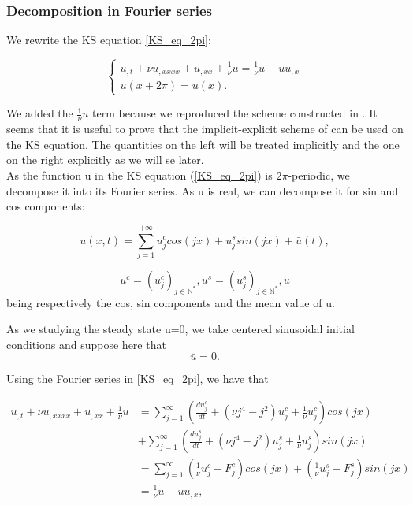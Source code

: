 \documentclass[12pt]{article}
\begin{document}
\subsubsection{Decomposition in Fourier series}
We rewrite the KS equation \ref{KS_eq_2pi}: 

\begin{equation}\label{KS_eq_2pi_1/nu}
\left\{
\begin{aligned}
    u_{,t}  + \nu u_{,xxxx} + u_{,xx} + \frac{1}{\nu}u=\frac{1}{\nu}u -uu_{,x}  \\
    u(x+2\pi)=u(x). 
\end{aligned}
\right.
\end{equation}

We added the $\frac{1}{\nu}u$ term because we reproduced the scheme constructed in \cite{Scheme_for_KS}. It seems that it is useful to prove that the implicit-explicit scheme of \cite{KS_scheme_C_A} can be used on the KS equation. The quantities on the left will be treated implicitly and the one on the right explicitly as we will se later.
\\

As the function u in the KS equation (\ref{KS_eq_2pi}) is $2\pi$-periodic, we decompose it into its Fourier series. As u is real, we can decompose it for sin and cos components:

\begin{equation}\label{u_Fourier_serie}
    u(x, t) = \sum_{j=1}^{+\infty} u_j^ccos(jx) + u_j^ssin(jx) + \bar{u}(t),
\end{equation}


$$u^c=(u_j^c)_{j\in \mathbb{N}^*}, u^s= (u_j^s)_{j\in\mathbb{N}^*}, \bar{u}$$ being respectively the cos, sin components and the mean value of u. 

As we studying the steady state u=0, we take centered sinusoidal initial conditions and suppose here that $$\bar{u}=0.$$


Using the Fourier series in \ref{KS_eq_2pi}, we have that

\begin{align*}
  u_{,t}  + \nu u_{,xxxx} + u_{,xx} + \frac{1}{\nu}u &= \sum_{j=1}^{\infty} (\frac{du_j^c}{dt} + (\nu j^4 - j^2)u_j^c +\frac{1}{\nu}u_j^c)cos(jx) \\ &+ \sum_{j=1}^{\infty}(\frac{du_j^s}{dt} + (\nu j^4 - j^2)u_j^s +\frac{1}{\nu}u_j^s)sin(jx)\\ &= \sum_{j=1}^{\infty} (\frac{1}{\nu}u_j^c- F_j^c)cos(jx)  +(\frac{1}{\nu}u_j^s- F_j^s)sin(jx) \\ &= \frac{1}{\nu}u - uu_{,x},
\end{align*}
\end{document}
